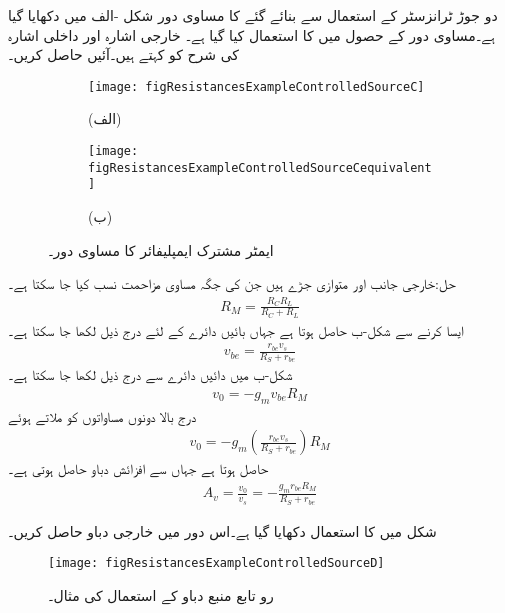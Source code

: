 دو جوڑ ٹرانزسٹر کے استعمال سے بنائے گئے  کا مساوی دور شکل -الف میں دکھایا گیا ہے۔مساوی دور کے حصول میں   کا استعمال کیا گیا ہے۔ خارجی اشارہ  اور داخلی اشارہ  کی شرح کو     کہتے ہیں۔آئیں  حاصل کریں۔
\begin{figure}
\centering
\centering
\begin{subfigure}{\textwidth}
\centering
\texttt{[image: figResistancesExampleControlledSourceC]}
\caption*{(الف)}
\end{subfigure}
\begin{subfigure}{\textwidth}
\centering
\texttt{[image: figResistancesExampleControlledSourceCequivalent]}
\caption*{(ب)}
\end{subfigure}
\caption{ایمٹر مشترک ایمپلیفائر کا مساوی دور۔}
\label{شکل_مزاحمتی_مثال_تابع_منبع_پ}
\end{figure}

حل:خارجی جانب  اور  متوازی جڑے ہیں جن کی جگہ مساوی مزاحمت  نسب کیا جا سکتا ہے۔
\begin{align*}
R_M=\frac{R_C R_L}{R_C+R_L}
\end{align*} 
ایسا کرنے سے شکل-ب حاصل ہوتا ہے جہاں  بائیں دائرے کے لئے درج ذیل لکھا جا سکتا ہے۔
\begin{align*}
v_{be}=\frac{r_{be} v_s}{R_S+r_{be}}
\end{align*} 
شکل-ب میں دائیں دائرے سے درج ذیل لکھا جا سکتا ہے۔
\begin{align*}
v_0=-g_m v_{be} R_M
\end{align*}
درج بالا دونوں مساواتوں کو ملاتے ہوئے
\begin{align*}
v_0=-g_m \left(\frac{r_{be} v_s}{R_S+r_{be}}\right) R_M
\end{align*}
حاصل ہوتا ہے جہاں سے افزائش دباو حاصل ہوتی ہے۔
\begin{align*}
A_v=\frac{v_0}{v_s}= -\frac{g_m r_{be} R_M}{R_S+r_{be}}
\end{align*}

شکل  میں  کا استعمال دکھایا گیا ہے۔اس دور میں خارجی دباو  حاصل کریں۔
\begin{figure}
\centering
\texttt{[image: figResistancesExampleControlledSourceD]}
\caption{رو تابع منبع دباو کے استعمال کی مثال۔}
\label{شکل_مزاحمتی_مثال_تابع_منبع_ت}
\end{figure}

